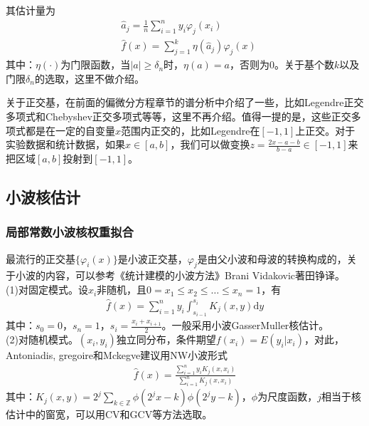         其估计量为
        \begin{align*}
        &\hat{a}_j = \frac{1}{n} \sum_{i=1}^n y_i\varphi_j(x_i)\\
        &\hat{f}(x) = \sum_{j=1}^k\eta(\hat{a}_j)\varphi_j(x)
        \end{align*}
        其中：$\eta(\cdot)$为门限函数，当$|a| \geqslant \delta_n$时，$\eta(a) = a$，否则为0。关于基个数$k$以及门限$\delta_n$的选取，这里不做介绍。
        \par
        关于正交基，在前面的偏微分方程章节的谱分析中介绍了一些，比如Legendre正交多项式和Chebyshev正交多项式等等，这里不再介绍。值得一提的是，这些正交多项式都是在一定的自变量$x$范围内正交的，比如Legendre在$[-1,1]$上正交。对于实验数据和统计数据，如果$x\in[a,b]$，我们可以做变换$z = \frac{2x - a -b}{b-a} \in [-1,1]$来把区域$[a,b]$投射到$[-1,1]$。

    \subsection{小波核估计}
        \subsubsection{局部常数小波核权重拟合}
            \par
            最流行的正交基$\{\varphi_i(x)\}$是小波正交基，$\varphi_j$是由父小波和母波的转换构成的，关于小波的内容，可以参考《统计建模的小波方法》Brani Vidakovic著田铮译。\\
            (1)对固定模式。设$x_i$非随机，且$0=x_1 \leqslant x_2 \leqslant\dots \leqslant x_n=1$，有
            \begin{align*}
            \hat{f}(x) = \sum_{i=1}^n y_i\int_{s_{i-1}}^{s_i}K_j(x,y)\mathrm{d}y
            \end{align*}
            其中：$s_0 = 0$，$s_n = 1$，$s_i=\frac{x_{i} + x_{i+1}}{2}$。一般采用小波GasserMuller核估计。\\
            (2)对随机模式。$(x_i,y_i)$独立同分布，条件期望$f(x_i) = E(y_i|x_i)$，对此，Antoniadis, gregoire和Mckegve建议用NW小波形式
            \begin{align*}
            \hat{f}(x) = \frac{\sum\limits_{i=1}^ny_iK_j(x,x_i)}{\sum\limits_{i=1}^nK_j(x,x_i)}
            \end{align*}
            其中：$K_j(x,y) = 2^j\sum\limits_{k\in \mathbb{Z}}\phi(2^jx-k)\phi(2^jy-k)$，$\phi$为尺度函数，$j$相当于核估计中的窗宽，可以用CV和GCV等方法选取。


